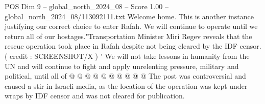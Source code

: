 \begin{textsample}{POS Dim 9 – global\_north\_2024\_08 – Score 1.00 – global\_north\_2024\_08/113092111.txt}
Welcome home.
This is another instance justifying our correct choice to enter Rafah.
We will continue to operate until we return all of our hostages."Transportation Minister Miri Regev reveals that the rescue operation took place in Rafah despite not being cleared by the IDF censor. ( credit : SCREENSHOT/X ) ' We will not take lessons in humanity from the UN and will continue to fight and apply unrelenting pressure, military and political, until all of @ @ @ @ @ @ @ @ @ @ The post was controversial and caused a stir in Israeli media, as the location of the operation was kept under wraps by IDF censor and was not cleared for publication.

\end{textsample}
